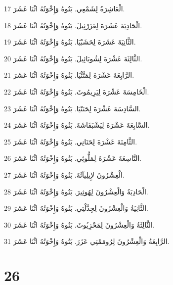 \par 17 الْعَاشِرَةُ لِشَمْعِي. بَنُوهُ وَإِخْوَتُهُ اثْنَا عَشَرَ.
\par 18 الْحَادِيَةَ عَشَرَةَ لِعَزَرْئِيلَ. بَنُوهُ وَإِخْوَتُهُ اثْنَا عَشَرَ.
\par 19 الثَّانِيَةَ عَشَرَةَ لِحَشَبْيَا. بَنُوهُ وَإِخْوَتُهُ اثْنَا عَشَرَ.
\par 20 الثَّالِثَةَ عَشْرَةَ لِشُوبَائِيلَ. بَنُوهُ وَإِخْوَتُهُ اثْنَا عَشَرَ.
\par 21 الرَّابِعَةَ عَشْرَةَ لِمَتَّثْيَا. بَنُوهُ وَإِخْوَتُهُ اثْنَا عَشَرَ.
\par 22 الْخَامِسَةَ عَشْرَةَ لِيَرِيمُوثَ. بَنُوهُ وَإِخْوَتُهُ اثْنَا عَشَرَ.
\par 23 السَّادِسَةَ عَشْرَةَ لِحَنَنْيَا. بَنُوهُ وَإِخْوَتُهُ اثْنَا عَشَرَ.
\par 24 السَّابِعَةَ عَشْرَةَ لِيَشْبَقَاشَةَ. بَنُوهُ وَإِخْوَتُهُ اثْنَا عَشَرَ.
\par 25 الثَّامِنَةَ عَشْرَةَ لِحَنَانِي. بَنُوهُ وَإِخْوَتُهُ اثْنَا عَشَرَ.
\par 26 التَّاسِعَةَ عَشْرَةَ لِمَلُّوثِي. بَنُوهُ وَإِخْوَتُهُ اثْنَا عَشَرَ.
\par 27 الْعِشْرُونَ لإِيلِيآثَةَ. بَنُوهُ وَإِخْوَتُهُ اثْنَا عَشَرَ.
\par 28 الْحَادِيَةُ وَالْعِشْرُونَ لِهُوثِيرَ. بَنُوهُ وَإِخْوَتُهُ اثْنَا عَشَرَ.
\par 29 الثَّانِيَةُ وَالْعِشْرُونَ لِجِدَّلْتِي. بَنُوهُ وَإِخْوَتُهُ اثْنَا عَشَرَ.
\par 30 الثَّالِثَةُ وَالْعِشْرُونَ لِمَحْزِيُوثَ. بَنُوهُ وَإِخْوَتُهُ اثْنَا عَشَرَ.
\par 31 الرَّابِعَةُ وَالْعِشْرُونَ لِرُومَمْتِي عَزَرَ. بَنُوهُ وَإِخْوَتُهُ اثْنَا عَشَرَ.

\chapter{26}


